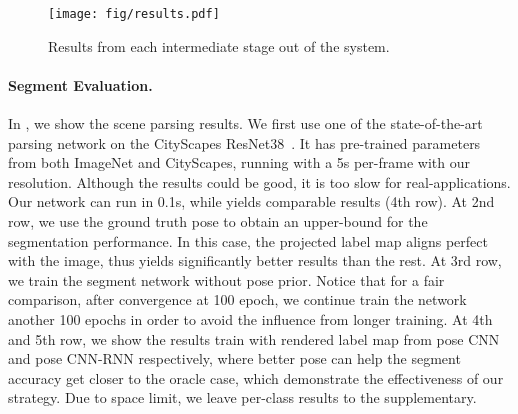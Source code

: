 \begin{figure*}
\texttt{[image: fig/results.pdf]}
   \caption{Results from each intermediate stage out of the system.}
\label{fig:results}
\vspace{-0.8\baselineskip}
\end{figure*}

\paragraph{Segment Evaluation.}
In , we show the scene parsing results. We first use one of the state-of-the-art parsing network on the CityScapes \ie ResNet38~\cite{WuSH16e}. It has pre-trained parameters from both ImageNet and CityScapes, running with a 5s per-frame with our resolution. Although the results could be good, it is too slow for real-applications. Our network can run in 0.1s, while yields comparable results (4th row). At 2nd row, we use the ground truth pose to obtain an upper-bound for the segmentation performance. In this case, the projected label map aligns perfect with the image, thus yields significantly better results than the rest. At 3rd row, we train the segment network without pose prior.  Notice that for a fair comparison, after convergence at 100 epoch, we continue train the network another 100 epochs in order to avoid the influence from longer training.
At 4th and 5th row, we show the results train with rendered label map from pose CNN and pose CNN-RNN respectively, where better pose can help the segment accuracy get closer to the oracle case, which demonstrate the effectiveness of our strategy. Due to space limit, we leave per-class results to the supplementary.


